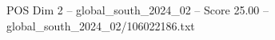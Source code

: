\begin{textsample}{POS Dim 2 – global\_south\_2024\_02 – Score 25.00 – global\_south\_2024\_02/106022186.txt}
\end{textsample}
